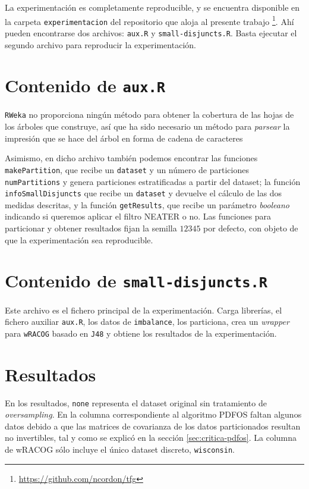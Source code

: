 La experimentación es completamente reproducible, y se encuentra disponible en la carpeta \texttt{experimentacion} del 
repositorio que aloja al presente trabajo \footnote{\url{https://github.com/ncordon/tfg}}.
Ahí pueden encontrarse dos archivos: \texttt{aux.R} y \texttt{small-disjuncts.R}. Basta ejecutar el segundo archivo
para reproducir la experimentación.

\section{Contenido de \texttt{aux.R}}
\texttt{RWeka} no proporciona ningún método para obtener la cobertura de las hojas de los árboles que construye, así que
ha sido necesario un método para \textit{parsear} la impresión que se hace del árbol en forma de cadena de caracteres


Asimismo, en dicho archivo también podemos encontrar las funciones \texttt{makePartition}, que recibe un \texttt{dataset}
y un número de particiones \texttt{numPartitions} y genera particiones estratificadas a partir del dataset; la
función \texttt{infoSmallDisjuncts} que recibe un \texttt{dataset} y devuelve el cálculo de las dos medidas descritas, y 
la función \texttt{getResults}, que recibe un parámetro \textit{booleano} indicando si queremos aplicar el filtro NEATER
o no. Las funciones para particionar y obtener resultados fijan la semilla $12345$ por defecto, con objeto de que la 
experimentación sea reproducible.


\section{Contenido de \texttt{small-disjuncts.R}}
Este archivo es el fichero principal de la experimentación. Carga librerías, el fichero auxiliar \texttt{aux.R}, los datos
de \texttt{imbalance}, los particiona, crea un \textit{wrapper} para \texttt{wRACOG} basado en \texttt{J48} y obtiene los 
resultados de la experimentación.

\section{Resultados}
En los resultados, \texttt{none} representa el dataset original sin tratamiento de \textit{oversampling}. En la columna
correspondiente al algoritmo PDFOS faltan algunos datos debido a que las matrices de covarianza de los datos particionados 
resultan no invertibles, tal y como se explicó en la sección \ref{sec:critica-pdfos}. La columna de wRACOG sólo incluye el
único dataset discreto, \texttt{wisconsin}.
